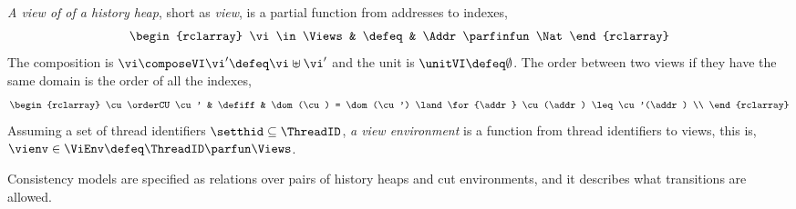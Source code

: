 \begin{defn}[Views]
\label{def:cuts}
\emph{A view of of a history heap}, short as \emph{view}, is a partial function from addresses to indexes,
\[
\begin{rclarray}
    \vi \in \Views & \defeq & \Addr \parfinfun \Nat
\end{rclarray}
\]                                                                     
The composition is \( \vi \composeVI \vi' \defeq \vi \uplus \vi'\) and the unit is \( \unitVI \defeq \emptyset\).
The order between two views if they have the same domain is the order of all the indexes, 
\[
\begin{rclarray}
    \cu \orderCU \cu' & \defiff & \dom(\cu) = \dom(\cu') \land \for{\addr} \cu(\addr) \leq \cu'(\addr) \\
\end{rclarray}
\]
Assuming a set of thread identifiers \( \setthid \subseteq \ThreadID \), \emph{a view environment} is a function from thread identifiers to views, this is, \( \vienv \in \ViEnv \defeq \ThreadID \parfun \Views \).
\end{defn}

Consistency models are specified as relations over pairs of history heaps and cut environments, and it describes what transitions are allowed.

